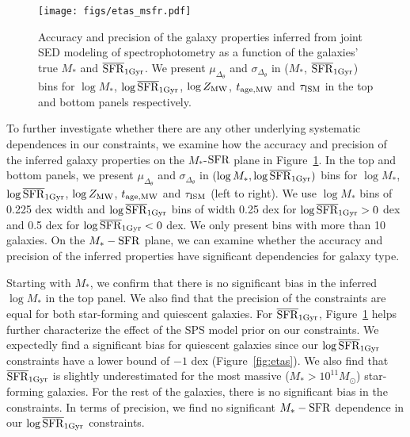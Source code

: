 \begin{figure}
\begin{center}
    \texttt{[image: figs/etas\_msfr.pdf]} 
    \caption{
        Accuracy and precision of the galaxy properties inferred from joint SED
        modeling of spectrophotometry as a function of the galaxies' true $M_*$
        and $\overline{\rm SFR}_{\rm 1Gyr}$. 
        We present $\mu_{\Delta_{\theta}}$ and $\sigma_{\Delta_{\theta}}$ in
        ($M_*$, $\overline{\rm SFR}_{\rm 1Gyr}$) bins for $\log M_*$, $\log\overline{\rm SFR}_{\rm 1Gyr}$, $\log Z_{\rm
        MW}$, $t_{\rm age, MW}$ and $\tau_{\rm ISM}$ in the top and bottom
        panels respectively. 
    }\label{fig:etas_msfr}
\end{center}
\end{figure}

To further investigate whether there are any other underlying systematic
dependences in our constraints, we examine how the accuracy and precision of
the inferred galaxy properties on the $M_*$-${\rm SFR}$ plane in
Figure~\ref{fig:etas_msfr}. 
In the top and bottom panels, we present $\mu_{\Delta_{\theta}}$ and 
$\sigma_{\Delta_{\theta}}$ in $(\log M_*, \log\overline{\rm SFR}_{\rm 1Gyr})$ bins for 
$\log M_*$, $\log\overline{\rm SFR}_{\rm 1Gyr}$, $\log Z_{\rm MW}$, $t_{\rm age, MW}$ and $\tau_{\rm ISM}$ (left to
right).
We use $\log M_*$ bins of 0.225 dex width and $\log\overline{\rm SFR}_{\rm 1Gyr}$ bins of width 
0.25 dex for $\log \overline{\rm SFR}_{\rm 1Gyr} > 0$ dex and 0.5 dex for $\log \overline{\rm SFR}_{\rm 1Gyr} < 0$ dex. 
We only present bins with more than 10 galaxies. 
On the $M_*-{\rm SFR}$ plane, we can examine whether the accuracy and precision
of the inferred properties have significant dependencies for galaxy type.

Starting with $M_*$, we confirm that there is no significant bias in the
inferred $\log M_*$ in the top panel. 
We also find that the precision of the constraints are equal for both
star-forming and quiescent galaxies. 
For $\overline{\rm SFR}_{\rm 1Gyr}$, Figure~\ref{fig:etas_msfr} helps further characterize the effect
of the SPS model prior on our constraints. 
We expectedly find a significant bias for quiescent galaxies since our
$\log\overline{\rm SFR}_{\rm 1Gyr}$ constraints have a lower bound of $-1$ dex (Figure~\ref{fig:etas}).
We also find that $\overline{\rm SFR}_{\rm 1Gyr}$ is slightly underestimated for the most massive
($M_* > 10^{11}M_\odot$) star-forming galaxies. 
For the rest of the galaxies, there is no significant bias in the constraints. 
In terms of precision, we find no significant $M_*-{\rm SFR}$ dependence in our
$\log\overline{\rm SFR}_{\rm 1Gyr}$ constraints. 

